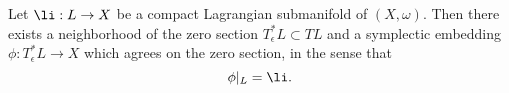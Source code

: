 

Let $\li: L\to X$ be a compact Lagrangian submanifold of $(X,  \omega)$. Then there exists a neighborhood of the zero section $T^*_\epsilon L\subset TL$ and a symplectic embedding $\phi: T^*_\epsilon L\to X$ which agrees on the zero section, in the sense that 
\[\phi|_L=\li.\]